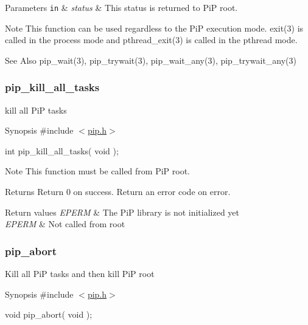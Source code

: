 \begin{DoxyParams}[1]{Parameters}
\mbox{\tt in}  & {\em status} & This status is returned to Pi\-P root.\\
\hline
\end{DoxyParams}
\begin{DoxyNote}{Note}
This function can be used regardless to the Pi\-P execution mode. {\ttfamily exit(3)} is called in the process mode and {\ttfamily pthread\-\_\-exit(3)} is called in the pthread mode.
\end{DoxyNote}
\begin{DoxySeeAlso}{See Also}
pip\-\_\-wait(3), pip\-\_\-trywait(3), pip\-\_\-wait\-\_\-any(3), pip\-\_\-trywait\-\_\-any(3) 
\end{DoxySeeAlso}
\hypertarget{pip_kill_all_tasks}{}\subsubsection{pip\-\_\-kill\-\_\-all\-\_\-tasks}\label{pip_kill_all_tasks}
kill all Pi\-P tasks

\begin{DoxyParagraph}{Synopsis}
\#include $<$\hyperlink{pip_8h_source}{pip.\-h}$>$ \par
int pip\-\_\-kill\-\_\-all\-\_\-tasks( void );
\end{DoxyParagraph}
\begin{DoxyNote}{Note}
This function must be called from Pi\-P root.
\end{DoxyNote}
\begin{DoxyReturn}{Returns}
Return 0 on success. Return an error code on error. 
\end{DoxyReturn}

\begin{DoxyRetVals}{Return values}
{\em E\-P\-E\-R\-M} & The Pi\-P library is not initialized yet \\
\hline
{\em E\-P\-E\-R\-M} & Not called from root \\
\hline
\end{DoxyRetVals}
\hypertarget{pip_abort}{}\subsubsection{pip\-\_\-abort}\label{pip_abort}
Kill all Pi\-P tasks and then kill Pi\-P root

\begin{DoxyParagraph}{Synopsis}
\#include $<$\hyperlink{pip_8h_source}{pip.\-h}$>$ \par
void pip\-\_\-abort( void ); 
\end{DoxyParagraph}
